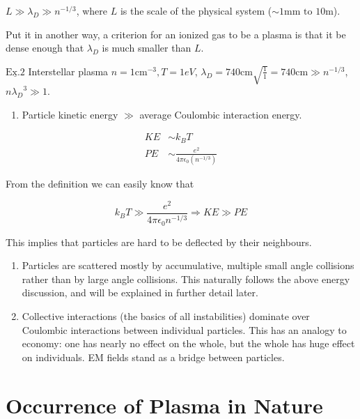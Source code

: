 \documentclass[
  notoc %
]{tufte-book}
\providecommand{\tightlist}{%
  \setlength{\itemsep}{0pt}\setlength{\parskip}{0pt}
}
\begin{document}
\(L\gg\lambda_{D}\gg n^{-1/3}\), where \(L\) is the scale of the
physical system (\(\sim 1\text{mm}\text{ to }10\text{m}\)).

Put it in another way, a criterion for an ionized gas to be a plasma is
that it be dense enough that \(\lambda_D\) is much smaller than \(L\).

\(\underline{\text{Ex}.2}\) Interstellar plasma
\(n=1 \text{cm}^{-3}, T=1eV\),
\(\lambda_D=740\text{cm}\sqrt{\frac{1}{1}}=740\text{cm} \gg n^{-1/3}\),
\(n{\lambda_D}^3\gg1\).

\begin{enumerate}
\def\labelenumi{\arabic{enumi}.}
\setcounter{enumi}{1}
\tightlist
\item
  Particle kinetic energy \(\gg\) average Coulombic interaction energy.
\end{enumerate}

\[
\begin{split}
KE&\sim k_B T \\
PE&\sim \frac{e^2}{4\pi\epsilon_0(n^{-1/3})}
\end{split}
\]

From the definition we can easily know that

\[
k_B T\gg \frac{e^2}{4\pi\epsilon_0 n^{-1/3}}\Rightarrow KE\gg PE
\]

This implies that particles are hard to be deflected by their
neighbours.

\begin{enumerate}
\def\labelenumi{\arabic{enumi}.}
\setcounter{enumi}{2}
\item
  Particles are scattered mostly by accumulative, multiple small angle
  collisions rather than by large angle collisions. This naturally
  follows the above energy discussion, and will be explained in further
  detail later.
\item
  Collective interactions (the basics of all instabilities) dominate
  over Coulombic interactions between individual particles. This has an
  analogy to economy: one has nearly no effect on the whole, but the
  whole has huge effect on individuals. EM fields stand as a bridge
  between particles.
\end{enumerate}

\hypertarget{occurrence-of-plasma-in-nature}{%
\section{Occurrence of Plasma in
Nature}\label{occurrence-of-plasma-in-nature}}
\end{document}
